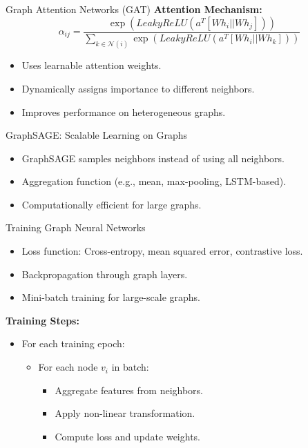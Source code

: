\documentclass{beamer}
\begin{document}
\begin{frame}{Graph Attention Networks (GAT)}
    \textbf{Attention Mechanism:}
    \[ \alpha_{ij} = \frac{\exp(LeakyReLU(a^T [W h_i || W h_j]))}{\sum_{k \in \mathcal{N}(i)} \exp(LeakyReLU(a^T [W h_i || W h_k]))} \]
    \begin{itemize}
        \item Uses learnable attention weights.
        \item Dynamically assigns importance to different neighbors.
        \item Improves performance on heterogeneous graphs.
    \end{itemize}
\end{frame}

\begin{frame}{GraphSAGE: Scalable Learning on Graphs}
    \begin{itemize}
        \item GraphSAGE samples neighbors instead of using all neighbors.
        \item Aggregation function (e.g., mean, max-pooling, LSTM-based).
        \item Computationally efficient for large graphs.
    \end{itemize}
\end{frame}

\begin{frame}{Training Graph Neural Networks}
    \begin{itemize}
        \item Loss function: Cross-entropy, mean squared error, contrastive loss.
        \item Backpropagation through graph layers.
        \item Mini-batch training for large-scale graphs.
    \end{itemize}
    \textbf{Training Steps:}
    \begin{itemize}
        \item For each training epoch:
        \begin{itemize}
            \item For each node \( v_i \) in batch:
            \begin{itemize}
                \item Aggregate features from neighbors.
                \item Apply non-linear transformation.
                \item Compute loss and update weights.
            \end{itemize}
        \end{itemize}
    \end{itemize}
\end{frame}
\end{document}
